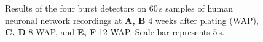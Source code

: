 \documentclass[12pt, titlepage]{article}
\begin{document}
		\begin{figure}[h]
			\centering
			\caption{Results of the four burst detectors on 60$\,$s samples of human neuronal network recordings at \textbf{A, B} 4 weeks after plating (WAP), \textbf{C, D} 8 WAP, and \textbf{E, F} 12 WAP. Scale bar represents 5$\,$s.}
			\label{hiPSN_examples}
		\end{figure}
		\clearpage
		 
		
	
\end{document}

